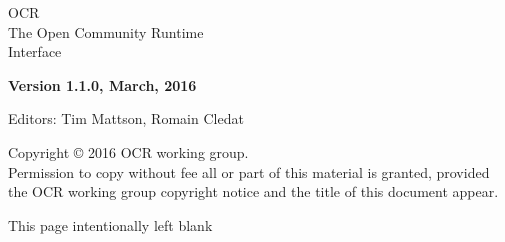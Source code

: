 
\begin{titlepage}

  \begin{adjustwidth}{-0.75in}{0in}
    \begin{center}
      \Huge
      \textsf{OCR\\The Open Community Runtime \\Interface}

      \vspace{0.5in}\textsf{ }\vspace{-0.7in}
      \normalsize
      \vspace{1.0in}
      \textbf{Version 1.1.0, March, 2016}
      \vspace{1.0in}

Editors: Tim Mattson, Romain Cledat
    \end{center}
  \end{adjustwidth}
  \vspace{2.0in}

  \begin{adjustwidth}{0pt}{1em}\setlength{\parskip}{0.25\baselineskip}%
Copyright © 2016 OCR working group.\\
Permission to copy without fee all or part of this material is granted,
provided the OCR working group copyright notice and
the title of this document appear.
  \end{adjustwidth}
\end{titlepage}


\clearpage
\thispagestyle{empty}
\phantom{a}
This page intentionally left blank
\vfill
